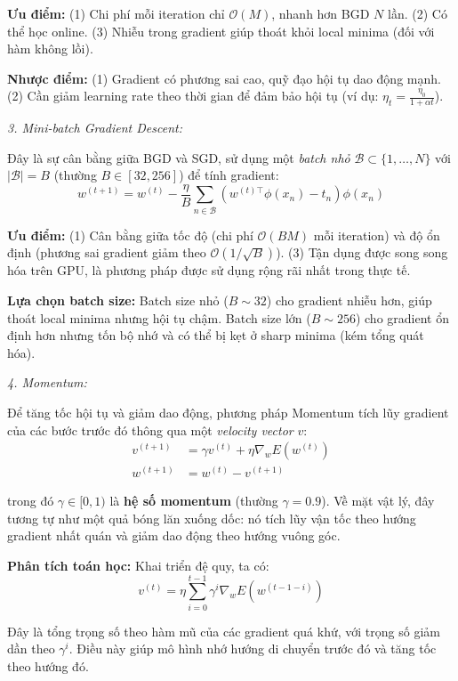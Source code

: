 \textbf{Ưu điểm:} (1) Chi phí mỗi iteration chỉ $\mathcal{O}(M)$, nhanh hơn BGD $N$ lần. (2) Có thể học online. (3) Nhiễu trong gradient giúp thoát khỏi local minima (đối với hàm không lồi).

\textbf{Nhược điểm:} (1) Gradient có phương sai cao, quỹ đạo hội tụ dao động mạnh. (2) Cần giảm learning rate theo thời gian để đảm bảo hội tụ (ví dụ: $\eta_t = \frac{\eta_0}{1 + \alpha t}$).

\textit{\textcolor{infocolor}{3. Mini-batch Gradient Descent:}}

Đây là sự cân bằng giữa BGD và SGD, sử dụng một \textit{batch nhỏ} $\mathcal{B} \subset \{1, \ldots, N\}$ với $|\mathcal{B}| = B$ (thường $B \in [32, 256]$) để tính gradient:
$$w^{(t+1)} = w^{(t)} - \frac{\eta}{B} \sum_{n \in \mathcal{B}}(w^{(t)\top}\phi(x_n) - t_n)\phi(x_n)$$

\textbf{Ưu điểm:} (1) Cân bằng giữa tốc độ (chi phí $\mathcal{O}(BM)$ mỗi iteration) và độ ổn định (phương sai gradient giảm theo $\mathcal{O}(1/\sqrt{B})$). (3) Tận dụng được song song hóa trên GPU, là phương pháp được sử dụng rộng rãi nhất trong thực tế.

\textbf{Lựa chọn batch size:} Batch size nhỏ ($B \sim 32$) cho gradient nhiễu hơn, giúp thoát local minima nhưng hội tụ chậm. Batch size lớn ($B \sim 256$) cho gradient ổn định hơn nhưng tốn bộ nhớ và có thể bị kẹt ở sharp minima (kém tổng quát hóa).

\noindent\textcolor{infocolor}{\textit{4. Momentum:}}

Để tăng tốc hội tụ và giảm dao động, phương pháp Momentum tích lũy gradient của các bước trước đó thông qua một \textit{velocity vector} $v$:
\begin{align*}
v^{(t+1)} &= \gamma v^{(t)} + \eta \nabla_w E(w^{(t)}) \\
w^{(t+1)} &= w^{(t)} - v^{(t+1)}
\end{align*}

trong đó $\gamma \in [0, 1)$ là \textbf{hệ số momentum} (thường $\gamma = 0.9$). Về mặt vật lý, đây tương tự như một quả bóng lăn xuống dốc: nó tích lũy vận tốc theo hướng gradient nhất quán và giảm dao động theo hướng vuông góc.

\textbf{Phân tích toán học:} Khai triển đệ quy, ta có:
$$v^{(t)} = \eta \sum_{i=0}^{t-1} \gamma^i \nabla_w E(w^{(t-1-i)})$$

Đây là tổng trọng số theo hàm mũ của các gradient quá khứ, với trọng số giảm dần theo $\gamma^i$. Điều này giúp mô hình nhớ hướng di chuyển trước đó và tăng tốc theo hướng đó.

